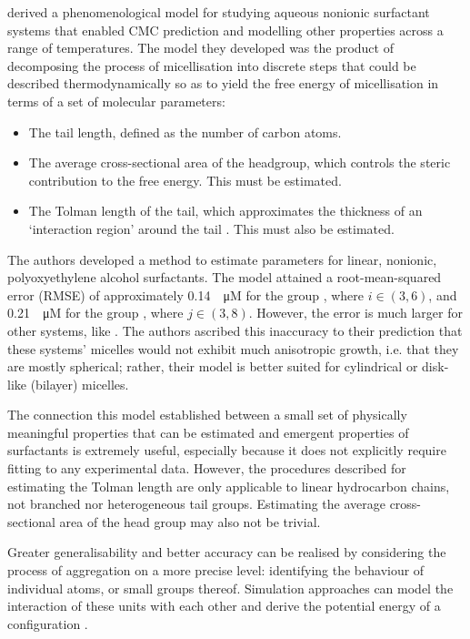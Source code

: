 \citet{puvvadaMolecularThermodynamicApproach1990} derived a phenomenological
model for studying aqueous nonionic surfactant systems that enabled CMC
prediction and modelling other properties across a range of temperatures. The
model they developed was the product of decomposing the process of micellisation
into discrete steps that could be described thermodynamically so as to yield the
free energy of micellisation in terms of a set of molecular parameters:

\begin{itemize}
    \item The tail length, defined as the number of carbon atoms.
    \item The average cross-sectional area of the headgroup, which controls the
          steric contribution to the free energy. This must be estimated.
    \item The Tolman length of the tail, which approximates the thickness of an
          `interaction region' around the tail
          \cite{demiguelGibbsThermodynamicsSurface2021}. This must also be
          estimated.
\end{itemize}

The authors developed a method to estimate parameters for linear, nonionic,
polyoxyethylene alcohol surfactants. The model attained a root-mean-squared
error (RMSE) of approximately \SI{0.14}{\log \micro M} for the group
, where $i \in (3, 6)$, and \SI{0.21}{\log \micro M} for the group
, where $j \in (3, 8)$. However, the error is much larger for other
systems, like . The authors ascribed this inaccuracy to their
prediction that these systems' micelles would not exhibit much anisotropic
growth, i.e. that they are mostly spherical; rather, their model is better
suited for cylindrical or disk-like (bilayer) micelles.

The connection this model established between a small set of physically meaningful properties that can be estimated and emergent properties of surfactants is extremely useful, especially because it does not explicitly require fitting to any experimental data. However, the procedures described for estimating the Tolman length are only applicable to linear hydrocarbon chains, not branched nor heterogeneous tail groups. Estimating the average cross-sectional area of the head group may also not be trivial.

Greater generalisability and better accuracy can be realised by considering the
process of aggregation on a more precise level: identifying the behaviour of
individual atoms, or small groups thereof. Simulation approaches can model the
interaction of these units with each other and derive the potential energy of a
configuration
\cite{frenkelUnderstandingMolecularSimulation2001,joshiReviewAdvancementsCoarsegrained2021,filipeMolecularDynamicsSimulations2022}.

